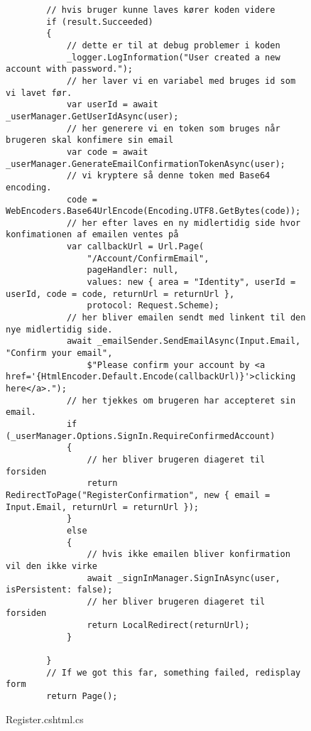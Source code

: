 \begin{figure}[!h]
    \begin{verbatim}
        // hvis bruger kunne laves kører koden videre 
        if (result.Succeeded)
        {
            // dette er til at debug problemer i koden
            _logger.LogInformation("User created a new account with password.");
            // her laver vi en variabel med bruges id som vi lavet før.
            var userId = await _userManager.GetUserIdAsync(user);
            // her generere vi en token som bruges når brugeren skal konfimere sin email
            var code = await _userManager.GenerateEmailConfirmationTokenAsync(user);
            // vi kryptere så denne token med Base64 encoding.
            code = WebEncoders.Base64UrlEncode(Encoding.UTF8.GetBytes(code));
            // her efter laves en ny midlertidig side hvor konfimationen af emailen ventes på
            var callbackUrl = Url.Page(
                "/Account/ConfirmEmail",
                pageHandler: null,
                values: new { area = "Identity", userId = userId, code = code, returnUrl = returnUrl },
                protocol: Request.Scheme);
            // her bliver emailen sendt med linkent til den nye midlertidig side.
            await _emailSender.SendEmailAsync(Input.Email, "Confirm your email",
                $"Please confirm your account by <a href='{HtmlEncoder.Default.Encode(callbackUrl)}'>clicking here</a>.");
            // her tjekkes om brugeren har accepteret sin email.
            if (_userManager.Options.SignIn.RequireConfirmedAccount)
            {
                // her bliver brugeren diageret til forsiden
                return RedirectToPage("RegisterConfirmation", new { email = Input.Email, returnUrl = returnUrl });
            }
            else
            {
                // hvis ikke emailen bliver konfirmation vil den ikke virke
                await _signInManager.SignInAsync(user, isPersistent: false);
                // her bliver brugeren diageret til forsiden
                return LocalRedirect(returnUrl);
            }

        }
        // If we got this far, something failed, redisplay form
        return Page();
\end{verbatim}
\caption{Register.cshtml.cs}\label{code:Register.cshtml.cs}
\end{figure}